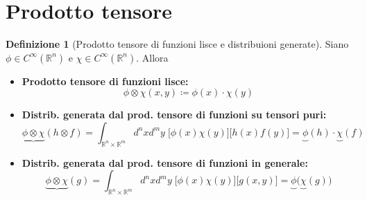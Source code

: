 \documentclass[a4paper,10pt]{article}
\theoremstyle{definition}
\newcommand{\re}{\mathbb{R}} %
\theoremstyle{indentdefinition}
\newtheorem{defn}{Definizione}[section]
\theoremstyle{indenttheorem}
\theoremstyle{myremark}
\theoremstyle{indentgeneral}
\begin{document}
\section{Prodotto tensore}
\begin{defn}[Prodotto tensore di funzioni lisce e distribuioni generate] Siano $\phi\in C^\infty(\re^n)$ e $\chi\in  C^\infty(\re^n)$. Allora
\begin{itemize}
    \item \textbf{Prodotto tensore di funzioni lisce:}
    $$\phi\otimes\chi(x,y)\coloneqq \phi(x)\cdot\chi(y)$$
    \item \textbf{Distrib. generata dal prod. tensore di funzioni su tensori puri:}
    $$\underbrace{\phi\otimes\chi}(h\otimes f)=\int_{\re^n\times\re^m}d^nxd^my\; \bigg[\phi(x)\chi(y)\bigg]\bigg[h(x)f(y)\bigg]=\underbrace{\phi}(h)\cdot \underbrace{\chi}(f)$$
    \item \textbf{Distrib. generata dal prod. tensore di funzioni in generale:}
    $$\underbrace{\phi\otimes\chi}(g)=\int_{\re^n\times\re^m}d^nxd^my\; \bigg[\phi(x)\chi(y)\bigg]\bigg[g(x,y)\bigg]=\underbrace{\phi}\bigg(\underbrace{\chi}(g)\bigg)$$
    \end{itemize}
    
\end{defn}
\end{document}
